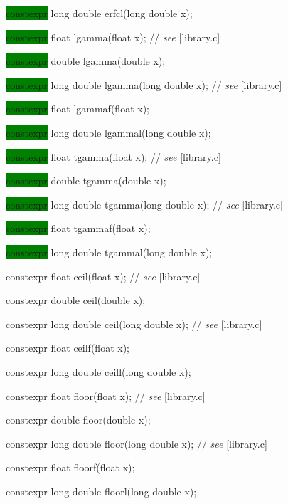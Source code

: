 \documentclass[prd,twocolumn,amsmath,amssymb,nofootinbib,eqsecnum]{revtex4-1}
\newcommand{\highlight}[1]{\colorbox{green}{\!\!\!\! #1}}
\newcommand{\oldhighlight}[1]{#1}
\newcommand{\stdcomment}[1]{{// {\it see} [#1]}}
\begin{document}
{\highlight{constexpr} long double erfcl(long double x);

\vspace{2ex}


\highlight{constexpr} float lgamma(float x); \stdcomment{library.c}

\highlight{constexpr} double lgamma(double x);

\highlight{constexpr} long double lgamma(long double x); \stdcomment{library.c}

\highlight{constexpr} float lgammaf(float x);

\highlight{constexpr} long double lgammal(long double x);

\vspace{2ex}

\highlight{constexpr} float tgamma(float x); \stdcomment{library.c}

\highlight{constexpr} double tgamma(double x);

\highlight{constexpr} long double tgamma(long double x); \stdcomment{library.c}

\highlight{constexpr} float tgammaf(float x);

\highlight{constexpr} long double tgammal(long double x);

\vspace{2ex}

\oldhighlight{constexpr} float ceil(float x); \stdcomment{library.c}

\oldhighlight{constexpr} double ceil(double x);

\oldhighlight{constexpr} long double ceil(long double x); \stdcomment{library.c}

\oldhighlight{constexpr} float ceilf(float x);

\oldhighlight{constexpr} long double ceill(long double x);

\vspace{2ex}


\oldhighlight{constexpr} float floor(float x); \stdcomment{library.c}

\oldhighlight{constexpr} double floor(double x);

\oldhighlight{constexpr} long double floor(long double x); \stdcomment{library.c}

\oldhighlight{constexpr} float floorf(float x);

\oldhighlight{constexpr} long double floorl(long double x);

}
\end{document}
